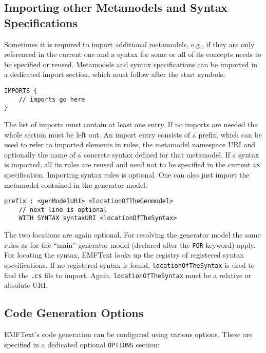 \subsection{Importing other Metamodels and Syntax Specifications}
\label{sec:cs_import}
Sometimes it is required to import additional metamodels, e.g., if they are only
referenced in the current one and a syntax for some or all of its concepts
needs to be specified or reused. 
Metamodels and syntax specifications can be 
imported in a dedicated import section, which must follow after the start symbols:

\lstset{language=CS}
\begin{lstlisting}
IMPORTS {
    // imports go here
}
\end{lstlisting}

The list of imports must contain at least one entry. If no imports are 
needed the whole section must be left out. An import entry consists of a prefix, 
which can be used to refer to imported elements in rules, the metamodel
namespace URI and optionally the name of a concrete syntax defined for that
metamodel. If a syntax is imported, all its rules are reused and need not to be
specified in the current \texttt{cs} specification. Importing syntax rules is
optional. One can also just import the metamodel contained in the generator model.

\lstset{language=CS}
\begin{lstlisting}
prefix : <genModelURI> <locationOfTheGenmodel>
    // next line is optional 
    WITH SYNTAX syntaxURI <locationOfTheSyntax>
\end{lstlisting}

The two locations are again optional. For resolving the generator model the same
rules as for the ``main'' generator model (declared after the \texttt{FOR}
keyword) apply. For locating the syntax, EMFText looks up the registry of
registered syntax specifications. If no registered syntax is found, 
\texttt{locationOfTheSyntax} is used to find the \texttt{.cs} file to import.
Again, \texttt{locationOfTheSyntax} must be a relative or absolute URI.

\subsection{Code Generation Options}

EMFText's code generation can be configured using various options. These are
specified in a dedicated optional \texttt{OPTIONS} section:

